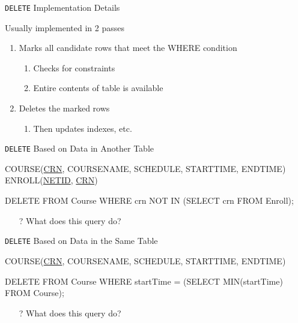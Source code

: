 \documentclass[aspectratio=169]{beamer}
\begin{document}
\begin{frame}[fragile]{\texttt{DELETE} Implementation Details}

Usually implemented in 2 passes
\begin{enumerate}
\item Marks all candidate rows that meet the WHERE condition
\begin{enumerate}
\item Checks for constraints
\item Entire contents of table is available 
\end{enumerate}
\item Deletes the marked rows
\begin{enumerate}
\item Then updates indexes, etc.
\end{enumerate}
\end{enumerate}

\end{frame}
\begin{frame}[fragile]{\texttt{DELETE} Based on Data in Another Table}

COURSE(\underline{CRN}, COURSENAME, SCHEDULE, STARTTIME, ENDTIME)\\

ENROLL(\underline{NETID}, \underline{CRN})\\

\begin{SQL}
DELETE 
FROM Course 
WHERE crn NOT IN 
	(SELECT crn
	 FROM Enroll);
\end{SQL}

\begin{itemize}
\item[?] What does this query do?
\end{itemize}
\end{frame}

%
%

\begin{frame}[fragile]{\texttt{DELETE} Based on Data in the Same Table}

COURSE(\underline{CRN}, COURSENAME, SCHEDULE, STARTTIME, ENDTIME)\\

\begin{SQL}
DELETE 
FROM Course
WHERE startTime = 
	(SELECT MIN(startTime)
	 FROM Course);
\end{SQL}

\begin{itemize}
\item[?] What does this query do?
\end{itemize}
\end{frame}
\end{document}
